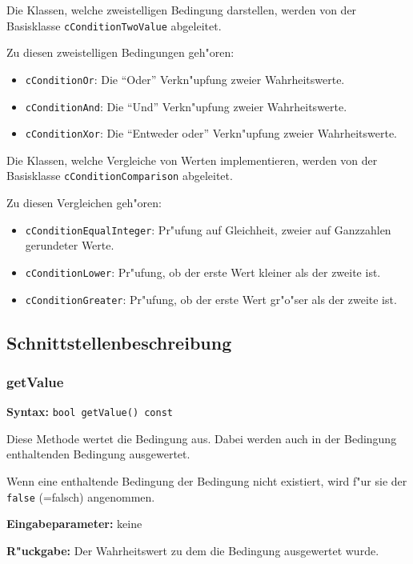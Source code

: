 \bigskip\noindent
Die Klassen, welche zweistelligen Bedingung darstellen, werden von der Basisklasse \verb|cConditionTwoValue| abgeleitet.

\bigskip\noindent
Zu diesen zweistelligen Bedingungen geh"oren:
\begin{itemize}
 \item \verb|cConditionOr|: Die ``Oder'' Verkn"upfung zweier Wahrheitswerte.
 \item \verb|cConditionAnd|: Die ``Und'' Verkn"upfung zweier Wahrheitswerte.
 \item \verb|cConditionXor|: Die ``Entweder oder'' Verkn"upfung zweier Wahrheitswerte.
\end{itemize}

\bigskip\noindent
Die Klassen, welche Vergleiche von Werten implementieren, werden von der Basisklasse \verb|cConditionComparison| abgeleitet.

\bigskip\noindent
Zu diesen Vergleichen geh"oren:
\begin{itemize}
 \item \verb|cConditionEqualInteger|: Pr"ufung auf Gleichheit, zweier auf Ganzzahlen gerundeter Werte.
 \item \verb|cConditionLower|: Pr"ufung, ob der erste Wert kleiner als der zweite ist.
 \item \verb|cConditionGreater|: Pr"ufung, ob der erste Wert gr"o"ser als der zweite ist.
\end{itemize}


\subsection{Schnittstellenbeschreibung}

\subsubsection{getValue}

\textbf{Syntax:} \verb|bool getValue() const|

\bigskip\noindent
Diese Methode wertet die Bedingung aus. Dabei werden auch in der Bedingung enthaltenden Bedingung ausgewertet.

Wenn eine enthaltende Bedingung der Bedingung nicht existiert, wird f"ur sie der \verb|false| (=falsch) angenommen.

\bigskip\noindent
\textbf{Eingabeparameter:} keine

\bigskip\noindent
\textbf{R"uckgabe:} Der Wahrheitswert zu dem die Bedingung ausgewertet wurde.


